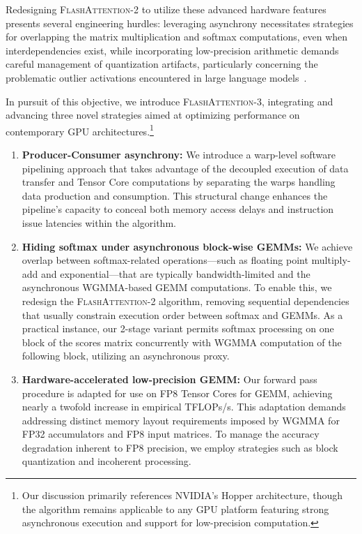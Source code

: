 Redesigning \textsc{FlashAttention-2} to utilize these advanced hardware features presents several engineering hurdles: leveraging asynchrony necessitates strategies for overlapping the matrix multiplication and softmax computations, even when interdependencies exist, while incorporating low-precision arithmetic demands careful management of quantization artifacts, particularly concerning the problematic outlier activations encountered in large language models~\citep{dettmers2208llm, sun2024massive}.

In pursuit of this objective, we introduce \textsc{FlashAttention-3}, integrating and advancing three novel strategies aimed at optimizing performance on contemporary GPU architectures.\footnote{Our discussion primarily references NVIDIA's Hopper architecture, though the algorithm remains applicable to any GPU platform featuring strong asynchronous execution and support for low-precision computation.}

\begin{enumerate}

\item \textbf{Producer-Consumer asynchrony:} We introduce a warp-level software pipelining approach that takes advantage of the decoupled execution of data transfer and Tensor Core computations by separating the warps handling data production and consumption. This structural change enhances the pipeline's capacity to conceal both memory access delays and instruction issue latencies within the algorithm.

\item \textbf{Hiding softmax under asynchronous block-wise GEMMs:} We achieve overlap between softmax-related operations—such as floating point multiply-add and exponential—that are typically bandwidth-limited and the asynchronous WGMMA-based GEMM computations. To enable this, we redesign the \textsc{FlashAttention-2} algorithm, removing sequential dependencies that usually constrain execution order between softmax and GEMMs. As a practical instance, our 2-stage variant permits softmax processing on one block of the scores matrix concurrently with WGMMA computation of the following block, utilizing an asynchronous proxy.

\item \textbf{Hardware-accelerated low-precision GEMM:} Our forward pass procedure is adapted for use on FP8 Tensor Cores for GEMM, achieving nearly a twofold increase in empirical TFLOPs/s. This adaptation demands addressing distinct memory layout requirements imposed by WGMMA for FP32 accumulators and FP8 input matrices. To manage the accuracy degradation inherent to FP8 precision, we employ strategies such as block quantization and incoherent processing.
\end{enumerate}

